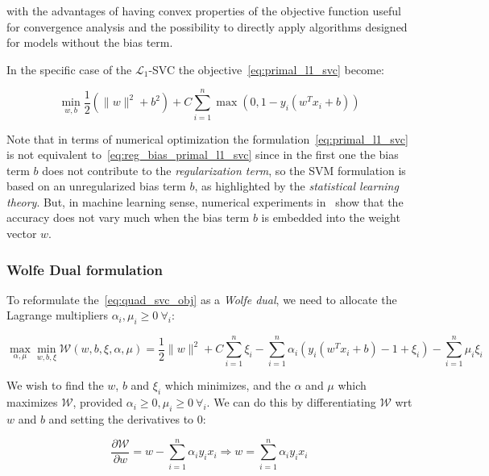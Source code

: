 with the advantages of having convex properties of the objective function useful for convergence analysis and the possibility to directly apply algorithms designed for models without the bias term.

In the specific case of the $\mathcal{L}_1$-SVC the objective~\eqref{eq:primal_l1_svc} become:

\begin{equation} \label{eq:reg_bias_primal_l1_svc}
    \min_{w,b} \frac{1}{2} (\| w \|^2 + b^2) + C \sum_{i=1}^n \max(0, 1 - y_i (w^T x_i + b))
\end{equation}

Note that in terms of numerical optimization the formulation~\eqref{eq:primal_l1_svc} is not equivalent to~\eqref{eq:reg_bias_primal_l1_svc} since in the first one the bias term $b$ does not contribute to the \emph{regularization term}, so the SVM formulation is based on an unregularized bias term $b$, as highlighted by the \emph{statistical learning theory}. But, in machine learning sense, numerical experiments in~\cite{hsu2002simple} show that the accuracy does not vary much when the bias term $b$ is embedded into the weight vector $w$.

\subsubsection{Wolfe Dual formulation}

To reformulate the~\eqref{eq:quad_svc_obj} as a \emph{Wolfe dual}, we need to allocate the Lagrange multipliers $\alpha_i, \mu_i \geq 0 \ \forall_i$:

\begin{equation} \label{eq:svc_wolfe_dual}
    \max_{\alpha,\mu} \min_{w,b,\xi} \mathcal{W}(w,b,\xi,\alpha,\mu) = \frac{1}{2} \| w \|^2 + C \sum_{i=1}^n \xi_i-\sum_{i=1}^n \alpha_i(y_i(w^T x_i + b)-1+\xi_i)-\sum_{i=1}^n\mu_i\xi_i
\end{equation}

We wish to find the $w$, $b$ and $\xi_i$ which minimizes, and the $\alpha$ and $\mu$ which maximizes $\mathcal{W}$, provided $\alpha_i\geq 0, \mu_i \geq 0 \ \forall_i$. We can do this by differentiating $\mathcal{W}$ wrt $w$ and $b$ and setting the derivatives to 0:

\begin{equation} \label{eq:svc_wolfe_der_w}
	\frac{\partial \mathcal{W}}{\partial w}=w-\sum_{i=1}^n \alpha_i y_i x_i \Rightarrow w=\sum_{i=1}^n \alpha_i y_i x_i
\end{equation}

